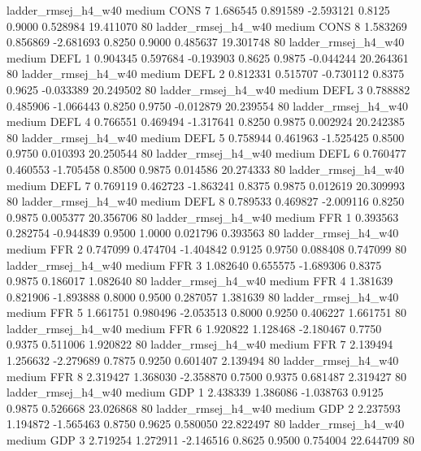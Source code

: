    ladder_rmsej_h4_w40     medium     CONS                 7  1.686545 0.891589 -2.593121 0.8125 0.9000  0.528984   19.411070 80
   ladder_rmsej_h4_w40     medium     CONS                 8  1.583269 0.856869 -2.681693 0.8250 0.9000  0.485637   19.301748 80
   ladder_rmsej_h4_w40     medium     DEFL                 1  0.904345 0.597684 -0.193903 0.8625 0.9875 -0.044244   20.264361 80
   ladder_rmsej_h4_w40     medium     DEFL                 2  0.812331 0.515707 -0.730112 0.8375 0.9625 -0.033389   20.249502 80
   ladder_rmsej_h4_w40     medium     DEFL                 3  0.788882 0.485906 -1.066443 0.8250 0.9750 -0.012879   20.239554 80
   ladder_rmsej_h4_w40     medium     DEFL                 4  0.766551 0.469494 -1.317641 0.8250 0.9875  0.002924   20.242385 80
   ladder_rmsej_h4_w40     medium     DEFL                 5  0.758944 0.461963 -1.525425 0.8500 0.9750  0.010393   20.250544 80
   ladder_rmsej_h4_w40     medium     DEFL                 6  0.760477 0.460553 -1.705458 0.8500 0.9875  0.014586   20.274333 80
   ladder_rmsej_h4_w40     medium     DEFL                 7  0.769119 0.462723 -1.863241 0.8375 0.9875  0.012619   20.309993 80
   ladder_rmsej_h4_w40     medium     DEFL                 8  0.789533 0.469827 -2.009116 0.8250 0.9875  0.005377   20.356706 80
   ladder_rmsej_h4_w40     medium      FFR                 1  0.393563 0.282754 -0.944839 0.9500 1.0000  0.021796    0.393563 80
   ladder_rmsej_h4_w40     medium      FFR                 2  0.747099 0.474704 -1.404842 0.9125 0.9750  0.088408    0.747099 80
   ladder_rmsej_h4_w40     medium      FFR                 3  1.082640 0.655575 -1.689306 0.8375 0.9875  0.186017    1.082640 80
   ladder_rmsej_h4_w40     medium      FFR                 4  1.381639 0.821906 -1.893888 0.8000 0.9500  0.287057    1.381639 80
   ladder_rmsej_h4_w40     medium      FFR                 5  1.661751 0.980496 -2.053513 0.8000 0.9250  0.406227    1.661751 80
   ladder_rmsej_h4_w40     medium      FFR                 6  1.920822 1.128468 -2.180467 0.7750 0.9375  0.511006    1.920822 80
   ladder_rmsej_h4_w40     medium      FFR                 7  2.139494 1.256632 -2.279689 0.7875 0.9250  0.601407    2.139494 80
   ladder_rmsej_h4_w40     medium      FFR                 8  2.319427 1.368030 -2.358870 0.7500 0.9375  0.681487    2.319427 80
   ladder_rmsej_h4_w40     medium      GDP                 1  2.438339 1.386086 -1.038763 0.9125 0.9875  0.526668   23.026868 80
   ladder_rmsej_h4_w40     medium      GDP                 2  2.237593 1.194872 -1.565463 0.8750 0.9625  0.580050   22.822497 80
   ladder_rmsej_h4_w40     medium      GDP                 3  2.719254 1.272911 -2.146516 0.8625 0.9500  0.754004   22.644709 80
